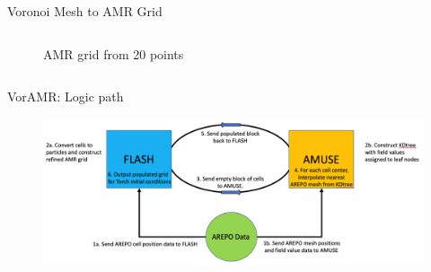 \documentclass[aspectratio=169]{beamer}
\begin{document}
\begin{frame}{Voronoi Mesh to AMR Grid}
\begin{columns}
\begin{column}{0.37\textwidth}
\begin{figure}[h!]
                \caption{AMR grid from 20 points}
                \label{fig:amr_example}
            \end{figure}
        \end{column}
    \end{columns}
\end{frame} 
%
%
%
%
%
\begin{frame}{VorAMR: Logic path}
	\begin{figure}[h!]
                \centering
                \includegraphics[width=\linewidth]{../images/voramr_logic.png} \\
                \label{fig:voramr_logic}
	\end{figure}
\end{frame}
\end{document}
